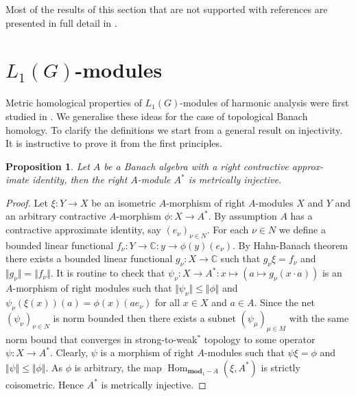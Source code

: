 \documentclass{article}
\theoremstyle{plain}
\newtheorem{proposition}{Proposition}[section]
\theoremstyle{definition}
\newtheorem{proof}{Proof}\def\theproof{}
\begin{document}
\begin{fulltext}
Most of the results of this section that are not supported with references are 
presented in full detail in \cite[section 3.3]{DalBanAlgAutCont}.


\section{\texorpdfstring{$L_1(G)$}{L1(G)}-modules}
\label{SubSectionL1GModules}

Metric homological properties of $L_1(G)$-modules of harmonic analysis 
were first studied in \cite{GravInjProjBanMod}. We generalise these ideas for the 
case of topological Banach homology. To clarify the definitions we start from a 
general result on injectivity. It is instructive to prove it from the first principles.

\begin{proposition}\label{AlgDualWithApproxIdIsMetrInj} Let $A$ be a Banach algebra with 
a right  contractive approx-\\imate identity, then the right $A$-module $A^*$ is 
metrically injective. 
\end{proposition}
\begin{proof} Let $\xi:Y\to X$ be an isometric $A$-morphism of right $A$-modules $X$ 
and $Y$ and an arbitrary contractive $A$-morphism $\phi: X\to A^*$. By assumption $A$ has 
a contractive approximate identity, say $(e_\nu)_{\nu\in N}$. For each $\nu\in N$ we 
define a bounded linear functional $f_\nu:Y\to\mathbb{C}:y\to \phi(y)(e_\nu)$. By Hahn-Banach 
theorem there exists a bounded linear functional $g_\nu:X\to\mathbb{C}$ such that 
$g_\nu\xi=f_\nu$ and $\Vert g_\nu\Vert=\Vert f_\nu\Vert$. It is routine to check that 
$\psi_\nu: X\to A^*:x\mapsto(a\mapsto g_\nu(x\cdot a))$ is an $A$-morphism of right modules 
such that $\Vert\psi_\nu\Vert\leq\Vert\phi\Vert$ and $\psi_\nu(\xi(x))(a)=\phi(x)(a e_\nu)$ 
for all $x\in X$ and $a\in A$. Since the net $(\psi_\nu)_{\nu\in N}$ is norm bounded then 
there exists a subnet $(\psi_\mu)_{\mu\in M}$ with the same norm bound that converges in 
strong-to-weak${}^*$ topology to some operator $\psi:X\to A^*$. Clearly, $\psi$ is a morphism 
of right $A$-modules such that $\psi\xi=\phi$ and $\Vert\psi\Vert\leq\Vert\phi\Vert$. 
As $\phi$ is arbitrary, the map $\operatorname{Hom}_{\mathbf{mod}_1-A}(\xi, A^*)$ is strictly 
coisometric. Hence $A^*$ is metrically injective.
\end{proof}


\end{fulltext}
\end{document}
